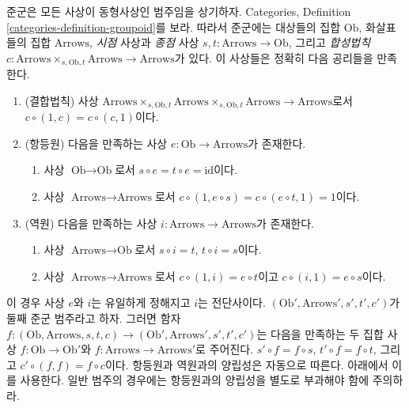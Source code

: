 \noindent
준군은 모든 사상이 동형사상인 범주임을 상기하자. Categories, Definition
\ref{categories-definition-groupoid}를 보라. 따라서 준군에는 대상들의 집합 $\text{Ob}$, 화살표들의 집합
$\text{Arrows}$, {\it 시점} 사상과 {\it 종점} 사상 $s, t : \text{Arrows} \to \text{Ob}$, 그리고
{\it 합성법칙} $c : \text{Arrows} \times_{s, \text{Ob}, t} \text{Arrows}
\to \text{Arrows}$가 있다. 이 사상들은 정확히 다음 공리들을 만족한다.
\begin{enumerate}
\item (결합법칙) 사상
$\text{Arrows} \times_{s, \text{Ob}, t}
\text{Arrows} \times_{s, \text{Ob}, t}
\text{Arrows} \to \text{Arrows}$로서 $c \circ (1, c) = c \circ (c, 1)$이다.
\item (항등원) 다음을 만족하는 사상 $e : \text{Ob} \to \text{Arrows}$가 존재한다.
\begin{enumerate}
\item 사상 $\text{Ob} \to \text{Ob}$로서 $s \circ e = t \circ e = \text{id}$이다.
\item 사상 $\text{Arrows} \to \text{Arrows}$로서
$c \circ (1, e \circ s) = c \circ (e \circ t, 1) = 1$이다.
\end{enumerate}
\item (역원) 다음을 만족하는 사상 $i : \text{Arrows} \to \text{Arrows}$가 존재한다.
\begin{enumerate}
\item 사상 $\text{Arrows} \to \text{Ob}$로서 $s \circ i = t$, $t \circ i = s$이다.
\item 사상 $\text{Arrows} \to \text{Arrows}$로서
$c \circ (1, i) = e \circ t$이고 $c \circ (i, 1) = e \circ s$이다.
\end{enumerate}
\end{enumerate}
이 경우 사상 $e$와 $i$는 유일하게 정해지고 $i$는 전단사이다. $(\text{Ob}', \text{Arrows}', s', t', c')$가
둘째 준군 범주라고 하자. 그러면 함자
$f : (\text{Ob}, \text{Arrows}, s, t, c) \to
(\text{Ob}', \text{Arrows}', s', t', c')$는 다음을 만족하는 두 집합 사상
$f : \text{Ob} \to \text{Ob}'$와 $f : \text{Arrows} \to \text{Arrows}'$로 주어진다.
$s' \circ f = f \circ s$, $t' \circ f = f \circ t$, 그리고 $c' \circ (f, f) = f \circ c$이다.
항등원과 역원과의 양립성은 자동으로 따른다. 아래에서 이를 사용한다. 일반 범주의 경우에는 항등원과의 양립성을
별도로 부과해야 함에 주의하라.

